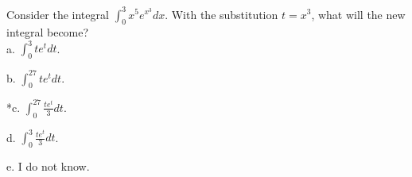 
Consider the integral \( \int_{0}^{3} x^{5}e^{x^{3}} dx \). With the substitution \( t = x^{3} \), what will the new integral become?\\


a. \( \int_{0}^{3} te^{t} dt \).

b. \( \int_{0}^{27} te^{t} dt \).

*c. \( \int_{0}^{27} \frac{ te^{t} }{ 3 } dt \).

d. \( \int_{0}^{3} \frac{ te^{t} }{ 3 } dt \).

e. I do not know.\\
